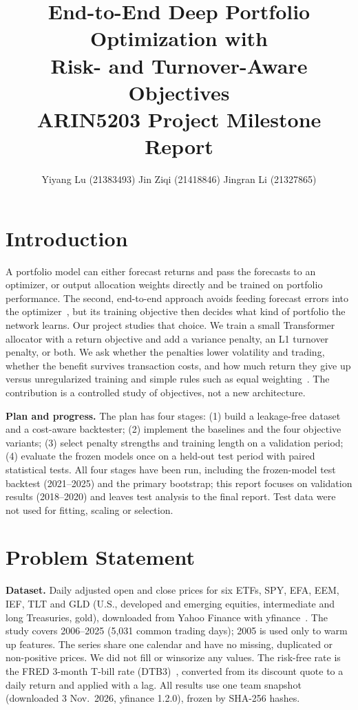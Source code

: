 \documentclass[10pt,twocolumn,letterpaper]{article}
\title{End-to-End Deep Portfolio Optimization with\\Risk- and Turnover-Aware Objectives\\[2pt]
\large ARIN5203 Project Milestone Report}
\author{Yiyang Lu (21383493) \qquad Jin Ziqi (21418846) \qquad Jingran Li (21327865)}
\begin{document}
\maketitle

\section{Introduction}

A portfolio model can either forecast returns and pass the forecasts to an optimizer, or output
allocation weights directly and be trained on portfolio performance. The second, end-to-end
approach avoids feeding forecast errors into the optimizer~\cite{zhang2020deep,kisiel2023portfolio},
but its training objective then decides what kind of portfolio the network learns. Our project
studies that choice. We train a small Transformer allocator with a return objective and add a
variance penalty, an L1 turnover penalty, or both. We ask whether the penalties lower
volatility and trading, whether the benefit survives transaction costs, and how much return
they give up versus unregularized training and simple rules such as equal
weighting~\cite{demiguel2009optimal}. The contribution is a controlled study of objectives, not a
new architecture.

\textbf{Plan and progress.} The plan has four stages: (1) build a leakage-free dataset and a
cost-aware backtester; (2) implement the baselines and the four objective variants; (3) select
penalty strengths and training length on a validation period; (4) evaluate the frozen models once on a
held-out test period with paired statistical tests. All four stages have been run, including the
frozen-model test backtest (2021--2025) and the primary bootstrap; this report focuses on
validation results (2018--2020) and leaves test analysis to the final report. Test data were not
used for fitting, scaling or selection.

\section{Problem Statement}

\textbf{Dataset.} Daily adjusted open and close prices for six ETFs, SPY, EFA, EEM, IEF, TLT and
GLD (U.S., developed and emerging equities, intermediate and long Treasuries, gold), downloaded
from Yahoo Finance with yfinance~\cite{yfinance}. The study covers 2006--2025 (5,031 common
trading days); 2005 is used only to warm up features. The series share one calendar and have no
missing, duplicated or non-positive prices. We did not fill or winsorize any values. The
risk-free rate is the FRED 3-month T-bill rate (DTB3)~\cite{fred_dtb3}, converted from its
discount quote to a daily return and applied with a lag. All results use one team snapshot
(downloaded 3 Nov.\ 2026, yfinance 1.2.0), frozen by SHA-256 hashes.
\end{document}
